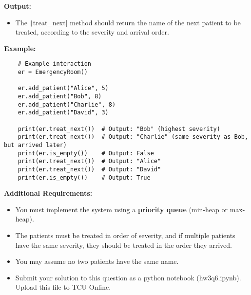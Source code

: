 \documentclass[addpoints,11pt]{exam}
\begin{document}
\begin{questions}
\textbf{Output:}
\begin{itemize}
	\item The \texttt|treat_next| method should return the name of the next patient to be treated, according to the severity and arrival order.
\end{itemize}

\textbf{Example:}

\begin{verbatim}
	# Example interaction
	er = EmergencyRoom()
	
	er.add_patient("Alice", 5)
	er.add_patient("Bob", 8)
	er.add_patient("Charlie", 8)
	er.add_patient("David", 3)
	
	print(er.treat_next())  # Output: "Bob" (highest severity)
	print(er.treat_next())  # Output: "Charlie" (same severity as Bob, but arrived later)
	print(er.is_empty())    # Output: False
	print(er.treat_next())  # Output: "Alice"
	print(er.treat_next())  # Output: "David"
	print(er.is_empty())    # Output: True
\end{verbatim}

\textbf{Additional Requirements:}
\begin{itemize}
	\item You must implement the system using a \textbf{priority queue} (min-heap or max-heap).
	\item The patients must be treated in order of severity, and if multiple patients have the same severity, they should be treated in the order they arrived.
	\item You may assume no two patients have the same name.
	\item Submit your solution to this question as a python notebook (hw3q6.ipynb).  Upload this file to TCU Online.
\end{itemize}
	

\end{questions}
\end{document}
